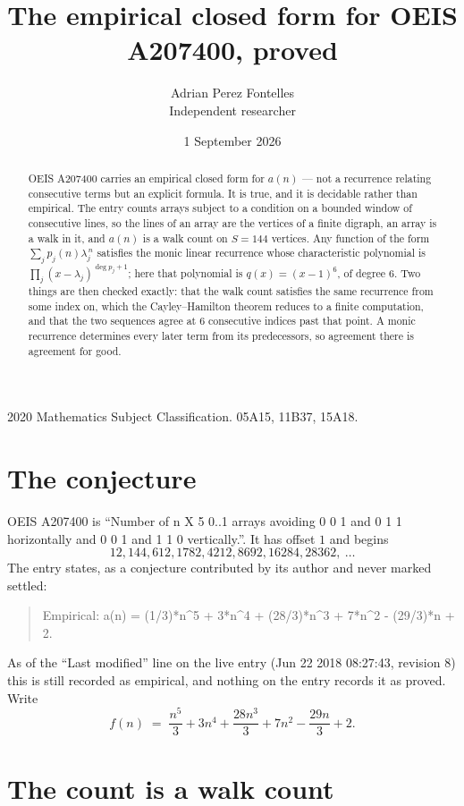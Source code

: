\documentclass[11pt,a4paper]{article}
\title{The empirical closed form for OEIS A207400, proved}
\author{Adrian Perez Fontelles\\ \small Independent researcher}
\date{1 September 2026}
\theoremstyle{plain}
\theoremstyle{definition}
\begin{document}
\maketitle

\begin{abstract}
OEIS A207400 carries an empirical closed form for $a(n)$ --- not a recurrence relating
consecutive terms but an explicit formula. It is true, and it is decidable rather than
empirical. The entry counts arrays subject to a condition on a bounded window of consecutive lines, so the lines of an array are the
vertices of a finite digraph, an array is a walk in it, and $a(n)$ is a walk count on
$S=144$ vertices. Any function of the form $\sum_j p_j(n)\lambda_j^{\,n}$ satisfies the
monic linear recurrence whose characteristic polynomial is
$\prod_j(x-\lambda_j)^{\deg p_j+1}$; here that polynomial is $q(x)=(x-1)^{6}$, of degree
$6$. Two things are then checked exactly: that the walk count satisfies the same
recurrence from some index on, which the Cayley--Hamilton theorem reduces to a finite
computation, and that the two sequences agree at $6$ consecutive indices past that
point. A monic recurrence determines every later term from its predecessors, so agreement
there is agreement for good.
\end{abstract}

\noindent\small 2020 Mathematics Subject Classification. 05A15, 11B37, 15A18.\normalsize

\section{The conjecture}

OEIS A207400 is ``Number of n X 5 0..1 arrays avoiding 0 0 1 and 0 1 1 horizontally and 0 0 1 and 1 1 0 vertically.''. It has offset $1$ and begins
\[
12, 144, 612, 1782, 4212, 8692, 16284, 28362,\ \dots
\]
The entry states, as a conjecture contributed by its author and never marked settled:
\begin{quote}
Empirical: a(n) = (1/3)*n\^{}5 + 3*n\^{}4 + (28/3)*n\^{}3 + 7*n\^{}2 - (29/3)*n + 2.
\end{quote}
As of the ``Last modified'' line on the live entry (Jun 22 2018 08:27:43, revision 8) this is still
recorded as empirical, and nothing on the entry records it as proved. Write
\[
f(n)\;=\;\frac{n^{5}}{3} + 3 n^{4} + \frac{28 n^{3}}{3} + 7 n^{2} - \frac{29 n}{3} + 2.
\]

\section{The count is a walk count}
\end{document}
